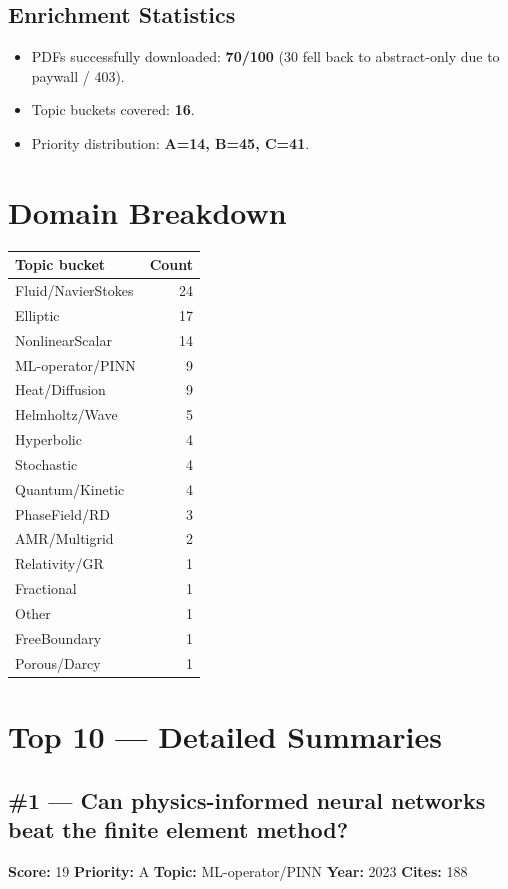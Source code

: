 \documentclass[10pt,letterpaper]{article}
\begin{document}
\subsection{Enrichment Statistics}

\begin{itemize}[nosep]
  \item PDFs successfully downloaded: \textbf{70/100}
    (30 fell back to abstract-only due to paywall / 403).
  \item Topic buckets covered: \textbf{16}.
  \item Priority distribution: \textbf{A=14, B=45, C=41}.
\end{itemize}

\section{Domain Breakdown}

\begin{center}
\begin{tabular}{lr}
\toprule
\textbf{Topic bucket} & \textbf{Count} \\
\midrule
Fluid/NavierStokes & 24 \\
Elliptic & 17 \\
NonlinearScalar & 14 \\
ML-operator/PINN & 9 \\
Heat/Diffusion & 9 \\
Helmholtz/Wave & 5 \\
Hyperbolic & 4 \\
Stochastic & 4 \\
Quantum/Kinetic & 4 \\
PhaseField/RD & 3 \\
AMR/Multigrid & 2 \\
Relativity/GR & 1 \\
Fractional & 1 \\
Other & 1 \\
FreeBoundary & 1 \\
Porous/Darcy & 1 \\
\bottomrule
\end{tabular}
\end{center}

\section{Top 10 — Detailed Summaries}

\subsection*{\#1 — Can physics-informed neural networks beat the finite element method?}
\textbf{Score:} 19 \quad \textbf{Priority:} A \quad \textbf{Topic:} ML-operator/PINN \quad \textbf{Year:} 2023 \quad \textbf{Cites:} 188
\end{document}

